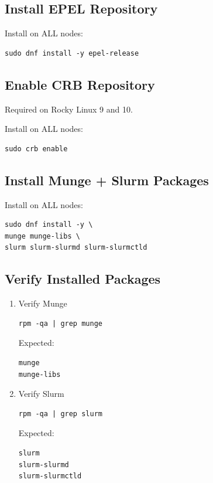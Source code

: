 \documentclass[11pt]{article}
\begin{document}
\subsection{Install EPEL Repository}
\label{sec:org2135ccb}

Install on ALL nodes:

\begin{verbatim}
sudo dnf install -y epel-release
\end{verbatim}
\subsection{Enable CRB Repository}
\label{sec:orgb318939}

Required on Rocky Linux 9 and 10.

Install on ALL nodes:

\begin{verbatim}
sudo crb enable
\end{verbatim}
\subsection{Install Munge + Slurm Packages}
\label{sec:org1400bde}

Install on ALL nodes:

\begin{verbatim}
sudo dnf install -y \
munge munge-libs \
slurm slurm-slurmd slurm-slurmctld
\end{verbatim}
\subsection{Verify Installed Packages}
\label{sec:org996442a}
\begin{enumerate}
\item Verify Munge
\label{sec:org171964d}

\begin{verbatim}
rpm -qa | grep munge
\end{verbatim}

Expected:

\begin{verbatim}
munge
munge-libs
\end{verbatim}
\item Verify Slurm
\label{sec:orge5b965c}

\begin{verbatim}
rpm -qa | grep slurm
\end{verbatim}

Expected:

\begin{verbatim}
slurm
slurm-slurmd
slurm-slurmctld
\end{verbatim}
\end{enumerate}
\end{document}

